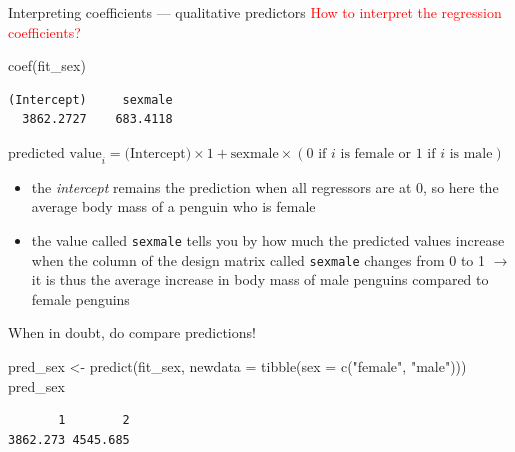 \documentclass[
  10pt,
  ignorenonframetext,
  aspectratio=169,
  t]{beamer}
\newenvironment{Shaded}{\begin{snugshade}}{\end{snugshade}}
\newcommand{\AttributeTok}[1]{\textcolor[rgb]{0.40,0.45,0.13}{#1}}
\newcommand{\FunctionTok}[1]{\textcolor[rgb]{0.28,0.35,0.67}{#1}}
\newcommand{\NormalTok}[1]{\textcolor[rgb]{0.00,0.23,0.31}{#1}}
\newcommand{\OtherTok}[1]{\textcolor[rgb]{0.00,0.23,0.31}{#1}}
\newcommand{\StringTok}[1]{\textcolor[rgb]{0.13,0.47,0.30}{#1}}
\providecommand{\tightlist}{%
  \setlength{\itemsep}{0pt}\setlength{\parskip}{0pt}}
\newcommand{\bluenorm}[1]{\textcolor{bluebeamer}{#1}}
\newcommand{\blueit}[1]{\textcolor{bluebeamer}{\emph{#1}}}
\let\oldtexttt\texttt
\renewcommand{\texttt}[1]{\colorbox{gray!20}{\oldtexttt{#1}}}
\begin{document}
\begin{frame}[fragile]{Interpreting coefficients --- qualitative
predictors}
\protect{}\label{interpreting-coefficients-qualitative-predictors-1}
\textcolor{red}{How to interpret the regression coefficients?}

\footnotesize

\begin{Shaded}
\begin{Highlighting}[]
\FunctionTok{coef}\NormalTok{(fit\_sex)}
\end{Highlighting}
\end{Shaded}

\begin{verbatim}
(Intercept)     sexmale 
  3862.2727    683.4118 
\end{verbatim}

\normalsize

\(\text{predicted value}_i = \text{(Intercept)} \times 1 + \text{sexmale} \times (0 \text{ if } i \text{ is female or } 1 \text{ if } i \text{ is male})\)

\begin{itemize}
\tightlist
\item
  the \blueit{intercept} remains the prediction when all regressors are
  at 0, so here the average body mass of a penguin who is
  \bluenorm{female}
\item
  the value called \texttt{sexmale} tells you by how much the predicted
  values increase when the column of the design matrix called
  \texttt{sexmale} changes from 0 to 1 \(\rightarrow\) it is thus the
  average increase in body mass of male penguins \bluenorm{compared to}
  female penguins
\end{itemize}

\bluenorm{When in doubt, do compare predictions!}

\footnotesize

\begin{Shaded}
\begin{Highlighting}[]
\NormalTok{pred\_sex }\OtherTok{\textless{}{-}} \FunctionTok{predict}\NormalTok{(fit\_sex, }\AttributeTok{newdata =} \FunctionTok{tibble}\NormalTok{(}\AttributeTok{sex =} \FunctionTok{c}\NormalTok{(}\StringTok{"female"}\NormalTok{, }\StringTok{"male"}\NormalTok{)))}
\NormalTok{pred\_sex}
\end{Highlighting}
\end{Shaded}

\begin{verbatim}
       1        2 
3862.273 4545.685 
\end{verbatim}

\normalsize
\end{frame}
\end{document}
